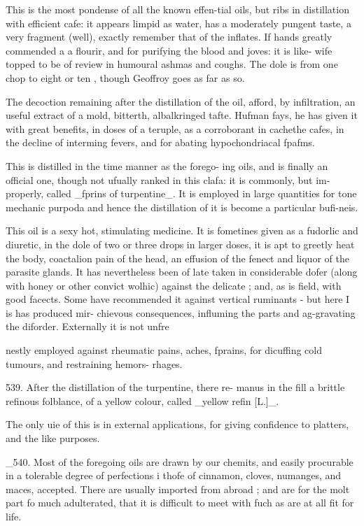 \documentclass{article}
\begin{document}
This is the most pondense of all the known effen-tial oils, but ribs in distillation with efficient cafe: it appears limpid as water, has a moderately pungent taste, a very fragment (well), exactly remember that of the inflates. If hands greatly commended a a flourir, and for purifying the blood and joves: it is like- wife topped to be of review in humoural ashmas and coughs. The dole is from one chop to eight or ten , though Geoffroy goes as far as so.

The decoction remaining after the distillation of the oil, afford, by infiltration, an useful extract of a mold, bitterth, albalkringed tafte. Hufman fays, he has given it with great benefits, in doses of a teruple, as a corroborant in cachethe cafes, in the decline of interming fevers, and for abating hypochondriacal fpafms.

This is distilled in the time manner as the forego- ing oils, and is finally an official one, though not ufually ranked in this clafa: it is commonly, but im- properly, called \_fprins of turpentine\_. It is employed in large quantities for tone mechanic purpoda and hence the distillation of it is become a particular bufi-neis.

This oil is a sexy hot, stimulating medicine. It is fometines given as a fudorlic and diuretic, in the dole of two or three drops in larger doses, it is apt to greetly heat the body, coactalion pain of the head, an effusion of the fenect and liquor of the parasite glands. It has nevertheless been of late taken in considerable dofer (along with honey or other convict wolhic) against the delicate ; and, as is field, with good facects. Some have recommended it against vertical ruminants - but here I is has produced mir- chievous consequences, influming the parts and ag-gravating the diforder. Externally it is not unfre

nestly employed against rheumatic pains, aches, fprains, for dicuffing cold tumours, and restraining hemors- rhages.

539. After the distillation of the turpentine, there re- manus in the fill a brittle refinous folblance, of a yellow colour, called \_yellow refin [L.]\_.

The only uie of this is in external applications, for giving confidence to platters, and the like purposes.

\_540. Most of the foregoing oils are drawn by our chemits, and easily procurable in a tolerable degree of perfections i thofe of cinnamon, cloves, numanges, and maces, accepted. There are usually imported from abroad ; and are for the molt part fo much adulterated, that it is difficult to meet with fuch as are at all fit for life.
\end{document}
